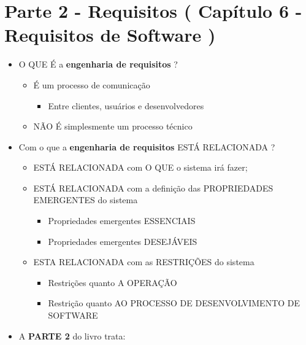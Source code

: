 \documentclass[
]{book}
\providecommand{\tightlist}{%
  \setlength{\itemsep}{0pt}\setlength{\parskip}{0pt}}
\begin{document}
\hypertarget{parte-2---requisitos-capuxedtulo-6---requisitos-de-software}{%
\section{Parte 2 - Requisitos ( Capítulo 6 - Requisitos de Software )}\label{parte-2---requisitos-capuxedtulo-6---requisitos-de-software}}

\begin{itemize}
\tightlist
\item
  O QUE É a \textbf{engenharia de requisitos} ?

  \begin{itemize}
  \tightlist
  \item
    É um processo de comunicação

    \begin{itemize}
    \tightlist
    \item
      Entre clientes, usuários e desenvolvedores
    \end{itemize}
  \item
    NÃO É simplesmente um processo técnico
  \end{itemize}
\item
  Com o que a \textbf{engenharia de requisitos} ESTÁ RELACIONADA ?

  \begin{itemize}
  \tightlist
  \item
    ESTÁ RELACIONADA com O QUE o sistema irá fazer;
  \item
    ESTÁ RELACIONADA com a definição das PROPRIEDADES EMERGENTES do sistema

    \begin{itemize}
    \tightlist
    \item
      Propriedades emergentes ESSENCIAIS
    \item
      Propriedades emergentes DESEJÁVEIS
    \end{itemize}
  \item
    ESTA RELACIONADA com as RESTRIÇÕES do sistema

    \begin{itemize}
    \tightlist
    \item
      Restrições quanto A OPERAÇÃO
    \item
      Restrição quanto AO PROCESSO DE DESENVOLVIMENTO DE SOFTWARE
    \end{itemize}
  \end{itemize}
\item
  A \textbf{PARTE 2} do livro trata:


\end{itemize}
\end{document}
